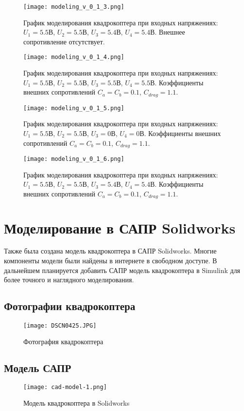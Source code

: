 \begin{figure}[ht]
    \centering
    \texttt{[image: modeling\_v\_0\_1\_3.png]}
    \caption{График моделирования квадрокоптера при входных напряжениях: \(U_1=5.5\)В, \(U_2=5.5\)В, \(U_3=5.4\)В, \(U_4=5.4\)В. Внешнее сопротивление отсутствует.}
    \label{fig:modeling-3}
\end{figure}

\begin{figure}[ht]
    \centering
    \texttt{[image: modeling\_v\_0\_1\_4.png]}
    \caption{График моделирования квадрокоптера при входных напряжениях: \(U_1=5.5\)В, \(U_2=5.5\)В, \(U_3=5.5\)В, \(U_4=5.5\)В. Коэффициенты внешних сопротивлений \(C_a=C_b=0.1\), \(C_{drag}=1.1\).}
    \label{fig:modeling-4}
\end{figure}

\begin{figure}[ht]
    \centering
    \texttt{[image: modeling\_v\_0\_1\_5.png]}
    \caption{График моделирования квадрокоптера при входных напряжениях: \(U_1=5.5\)В, \(U_2=5.5\)В, \(U_3=0\)В, \(U_4=0\)В. Коэффициенты внешних сопротивлений \(C_a=C_b=0.1\), \(C_{drag}=1.1\).}
    \label{fig:modeling-5}
\end{figure}


\begin{figure}[ht]
    \centering
    \texttt{[image: modeling\_v\_0\_1\_6.png]}
    \caption{График моделирования квадрокоптера при входных напряжениях: \(U_1=5.5\)В, \(U_2=5.5\)В, \(U_3=5.4\)В, \(U_4=5.4\)В. Коэффициенты внешних сопротивлений \(C_a=C_b=0.1\), \(C_{drag}=1.1\).}
    \label{fig:modeling-6}
\end{figure}


\section{Моделирование в САПР Solidworks}

Также была создана модель квадрокоптера в САПР Solidworks.
Многие компоненты модели были найдены в интернете в свободном
доступе. В дальнейшем планируется добавить САПР модель
квадрокоптера в Simulink для более точного и наглядного 
моделирования.

\subsection{Фотографии квадрокоптера}

\begin{figure}[ht]
    \centering
    \texttt{[image: DSCN0425.JPG]}
    \caption{Фотография квадрокоптера}
    \label{}
\end{figure}

\newpage

\subsection{Модель САПР}

\begin{figure}[ht]
    \centering
    \texttt{[image: cad-model-1.png]}
    \caption{Модель квадрокоптера в Solidworks}
    \label{}
\end{figure}


\endinput